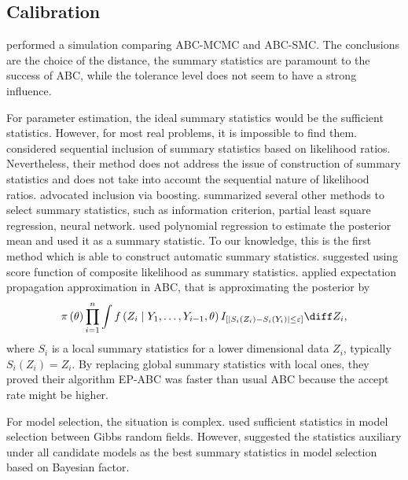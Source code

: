 \subsection{Calibration}

\citet{mckinley2009inference} performed a simulation comparing ABC-MCMC
and ABC-SMC. The conclusions are the choice of the distance, the summary
statistics are paramount to the success of ABC, while the tolerance
level does not seem to have a strong influence.

For parameter estimation, the ideal summary statistics would be the
sufficient statistics. However, for most real problems, it is impossible
to find them. \citet{joyce2008approximately} considered sequential
inclusion of summary statistics based on likelihood ratios. Nevertheless,
their method does not address the issue of construction of summary
statistics and does not take into account the sequential nature of
likelihood ratios. \citet{aeschbacher2012novel} advocated inclusion
via boosting. \citet{blum2013comparative} summarized several other
methods to select summary statistics, such as information criterion,
partial least square regression, neural network. \citet{fearnhead2012constructing}
used polynomial regression to estimate the posterior mean and used
it as a summary statistic. To our knowledge, this is the
first method which is able to  construct automatic summary statistics.
\citet{ruli2013approximate} suggested using score function of composite
likelihood as summary statistics. \citet{barthelme2014expectation}
applied expectation propagation approximation in ABC, that is approximating
the posterior by 
\[
\pi\left(\theta\right)\prod_{i=1}^{n}\int f\left(Z_{i}\mid Y_{1},\ldots,Y_{i-1},\theta\right)I_{\left[\left|S_{i}\left(Z_{i}\right)-S_{i}\left(Y_{i}\right)\right|\le\varepsilon\right]}\diff Z_{i},
\]
where $S_{i}$ is a local summary statistics for a lower dimensional
data $Z_{i}$, typically $S_{i}\left(Z_{i}\right)=Z_{i}$. By replacing
global summary statistics with local ones, they proved their algorithm
EP-ABC was faster than usual ABC because the accept rate might be
higher.

For model selection, the situation is complex. \citet{grelaud2009abc}
used sufficient statistics in model selection between Gibbs random
fields. However, \citet{marin2014relevant} suggested the statistics
auxiliary under all candidate models as the best summary statistics
in model selection based on Bayesian factor.%
\begin{comment}
add the paper post the problem of model selection in abc
\end{comment}


